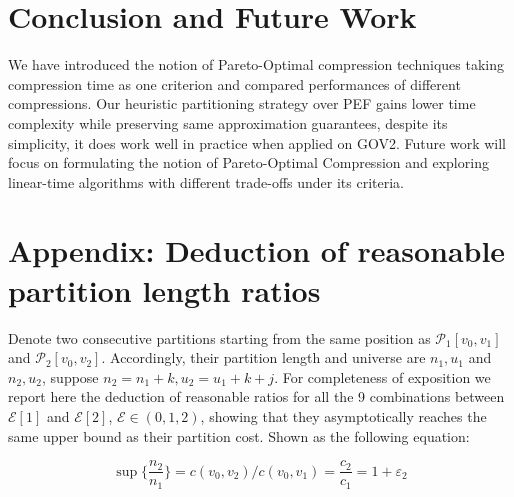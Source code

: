 \documentclass[runningheads,a4paper]{llncs}
\begin{document}
\section{Conclusion and Future Work}\label{sec:conclusion}

We have introduced the notion of Pareto-Optimal compression techniques taking compression time as one criterion and compared performances of different compressions.
Our heuristic partitioning strategy over PEF gains lower time complexity while preserving same approximation guarantees,
despite its simplicity, it does work well in practice when applied on GOV2.
Future work will focus on formulating the notion of Pareto-Optimal Compression and exploring linear-time algorithms with different trade-offs under its criteria.




\section*{Appendix: Deduction of reasonable partition length ratios}\label{sec:appendix}

Denote two consecutive partitions starting from the same position as $ \mathcal{P}_{1}[ v_0, v_1 ] $ and $ \mathcal{P}_{2}[v_0, v_2] $.
Accordingly, their partition length and universe are $ n_1, u_1 $ and $ n_2, u_2 $, suppose $n_2 = n_1 + k, u_2 = u_1 + k + j $.
For completeness of exposition we report here the deduction of reasonable ratios for all the 9 combinations between $ \mathcal{E}[1] $ and $ \mathcal{E}[2] $, $ \mathcal{E} \in (0,1,2) $, showing that they asymptotically reaches the same upper bound as their partition cost.
Shown as the following equation:

\begin{equation}
	\sup\{\frac{n_2}{n_{1}}\} = {c\left(v_{0},v_{2}\right)}/{c\left(v_{0},v_{1}\right)}=\frac{c_2}{c_1}=1+\varepsilon_{2}
\end{equation}
\end{document}
